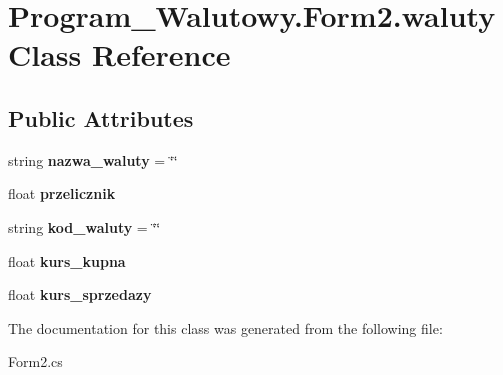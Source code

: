 \hypertarget{class_program___walutowy_1_1_form2_1_1waluty}{}\section{Program\+\_\+\+Walutowy.\+Form2.\+waluty Class Reference}
\label{class_program___walutowy_1_1_form2_1_1waluty}
\subsection*{Public Attributes}
\begin{DoxyCompactItemize}
\item 
\mbox{\label{class_program___walutowy_1_1_form2_1_1waluty_a1ba9ac7b07a818aedb1b9dbdd5567bc7}} 
string {\bfseries nazwa\+\_\+waluty} = \char`\"{}\char`\"{}
\item 
\mbox{\label{class_program___walutowy_1_1_form2_1_1waluty_a04c4a8f3899c8bbace9aea2dd04a8664}} 
float {\bfseries przelicznik}
\item 
\mbox{\label{class_program___walutowy_1_1_form2_1_1waluty_a5dac508f853eae694a3e37c396bff9db}} 
string {\bfseries kod\+\_\+waluty} = \char`\"{}\char`\"{}
\item 
\mbox{\label{class_program___walutowy_1_1_form2_1_1waluty_ab8a4d371e633b230572217b194e52902}} 
float {\bfseries kurs\+\_\+kupna}
\item 
\mbox{\label{class_program___walutowy_1_1_form2_1_1waluty_a9fa3e00e61570b7b7c74cc6ea85a956a}} 
float {\bfseries kurs\+\_\+sprzedazy}
\end{DoxyCompactItemize}


The documentation for this class was generated from the following file\+:\begin{DoxyCompactItemize}
\item 
Form2.\+cs\end{DoxyCompactItemize}
